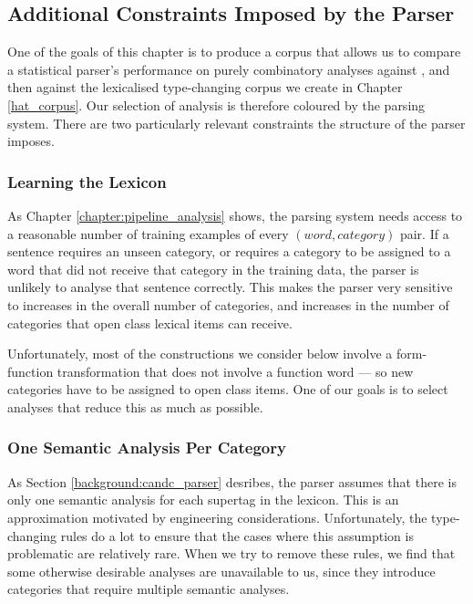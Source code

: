 \subsection{Additional Constraints Imposed by the \candc Parser}

One of the goals of this chapter is to produce a corpus that allows us to compare a statistical parser's performance on purely combinatory analyses against \ccgbank, and then against the lexicalised type-changing corpus we create in Chapter \ref{hat_corpus}. Our selection of analysis is therefore coloured by the \candc parsing system. There are two particularly relevant constraints the structure of the parser imposes.

\subsubsection{Learning the Lexicon}

As Chapter \ref{chapter:pipeline_analysis} shows, the parsing system needs access to a reasonable number of training examples of every $(word, category)$ pair. If a sentence requires an unseen category, or requires a category to be assigned to a word that did not receive that category in the training data, the parser is unlikely to analyse that sentence correctly. This makes the parser very sensitive to increases in the overall number of categories, and increases in the number of categories that open class lexical items can receive.

Unfortunately, most of the constructions we consider below involve a form-function transformation that does not involve a function word --- so new categories have to be assigned to open class items. One of our goals is to select analyses that reduce this as much as possible.

\subsubsection{One Semantic Analysis Per Category}

As Section \ref{background:candc_parser} desribes, the parser assumes that there is only one semantic analysis for each supertag in the lexicon. This is an approximation motivated by engineering considerations. Unfortunately, the \ccgbank type-changing rules do a lot to ensure that the cases where this assumption is problematic are relatively rare. When we try to remove these rules, we find that some otherwise desirable analyses are unavailable to us, since they introduce categories that require multiple semantic analyses. 

